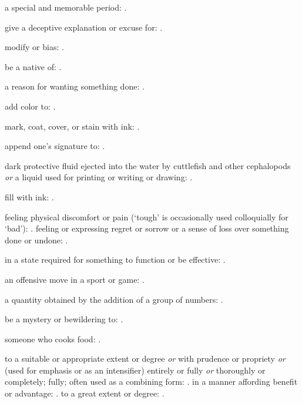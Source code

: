   a special and memorable period: .

  give a deceptive explanation or excuse for:   .

  modify or bias:   .

  be a native of:   .

  a reason for wanting something done:   .

  add color to:   .

  mark, coat, cover, or stain with ink: .

  append one's signature to: .

  dark protective fluid ejected into the water by cuttlefish and other cephalopods \textit{or} a liquid used for printing or writing or drawing: .

  fill with ink: .

  feeling physical discomfort or pain (`tough' is occasionally used colloquially for `bad'):   . feeling or expressing regret or sorrow or a sense of loss over something done or undone:   .

  in a state required for something to function or be effective: .

  an offensive move in a sport or game: .

  a quantity obtained by the addition of a group of numbers:   .

  be a mystery or bewildering to:   .

  someone who cooks food: .

  to a suitable or appropriate extent or degree \textit{or} with prudence or propriety \textit{or} (used for emphasis or as an intensifier) entirely or fully \textit{or} thoroughly or completely; fully; often used as a combining form: . in a manner affording benefit or advantage:   . to a great extent or degree:   .

